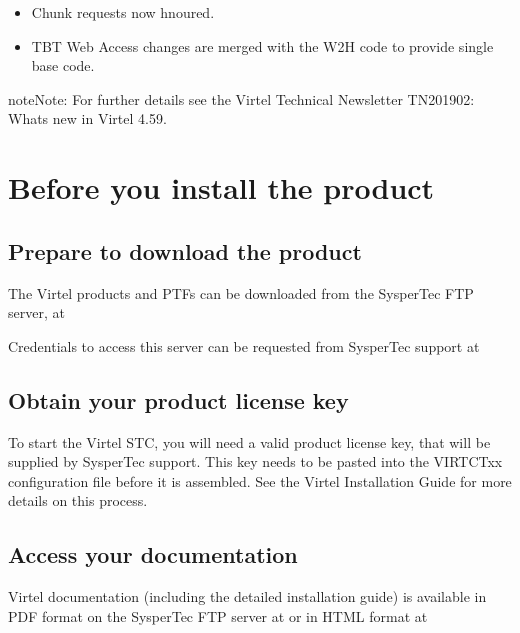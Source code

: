 \documentclass[letterpaper,10pt,english]{sphinxmanual}
\begin{document}
\begin{itemize}
\item {} 
Chunk requests now hnoured.

\end{itemize}

\begin{itemize}
\item {} 
TBT Web Access changes are merged with the W2H code to provide single base code.

\end{itemize}

\begin{sphinxadmonition}{note}{Note:}
For further details see the Virtel Technical Newsletter TN201902: Whats new in Virtel 4.59.
\end{sphinxadmonition}


\chapter{Before you install the product}
\label{\detokenize{Getting_Started:before-you-install-the-product}}

\section{Prepare to download the product}
\label{\detokenize{Getting_Started:prepare-to-download-the-product}}
The Virtel products and PTFs can be downloaded from the SysperTec FTP server, at 

Credentials to access this server can be requested from SysperTec support at 


\section{Obtain your product license key}
\label{\detokenize{Getting_Started:obtain-your-product-license-key}}
To start the Virtel STC, you will need a valid product license key, that will be supplied by SysperTec support. This key needs to be pasted into the VIRTCTxx configuration file before it is assembled. See the Virtel Installation Guide for more details on this process.


\section{Access your documentation}
\label{\detokenize{Getting_Started:access-your-documentation}}
Virtel documentation (including the detailed installation guide) is available in PDF format on the SysperTec FTP server at  or in HTML format at 
\end{document}
